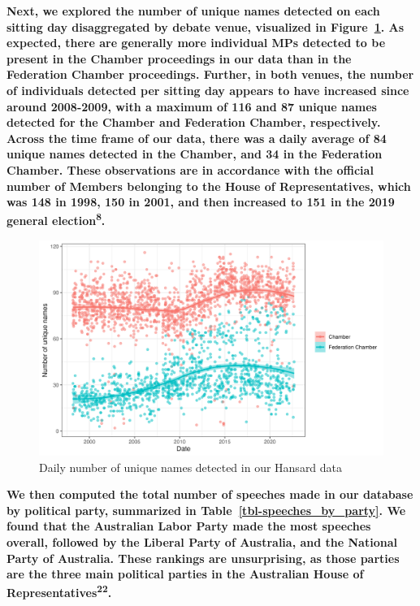 \documentclass[
  letterpaper,
  DIV=11,
  numbers=noendperiod]{scrartcl}
\begin{document}
\textbf{Next, we explored the number of unique names detected on each
sitting day disaggregated by debate venue, visualized in
Figure~\ref{fig-names}. As expected, there are generally more individual
MPs detected to be present in the Chamber proceedings in our data than
in the Federation Chamber proceedings. Further, in both venues, the
number of individuals detected per sitting day appears to have increased
since around 2008-2009, with a maximum of 116 and 87 unique names
detected for the Chamber and Federation Chamber, respectively. Across
the time frame of our data, there was a daily average of 84 unique names
detected in the Chamber, and 34 in the Federation Chamber. These
observations are in accordance with the official number of Members
belonging to the House of Representatives, which was 148 in 1998, 150 in
2001, and then increased to 151 in the 2019 general
election\textsuperscript{8}.}

\begin{figure}

{\centering \includegraphics[width=4.58333in,height=\textheight]{images/n_unique_names.png}

}

\caption{\label{fig-names}Daily number of unique names detected in our
Hansard data}

\end{figure}

\textbf{We then computed the total number of speeches made in our
database by political party, summarized in
Table~\ref{tbl-speeches_by_party}. We found that the Australian Labor
Party made the most speeches overall, followed by the Liberal Party of
Australia, and the National Party of Australia. These rankings are
unsurprising, as those parties are the three main political parties in
the Australian House of Representatives\textsuperscript{22}.}
\end{document}
